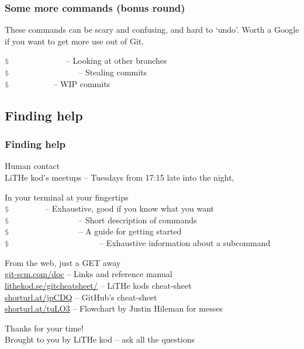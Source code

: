 \documentclass{beamer}
\newcommand{\command}[1]{\colorbox{black!78}{\vphantom{Ep}\texttt{\textcolor{gray}{\$}
\textcolor{white}{#1}}}}
\begin{document}
\begin{frame}[fragile]
  \frametitle{Some more commands (bonus round)}
  These commands can be scary and confusing, and hard to `undo'. Worth a Google if you
  want to get more use out of Git.
  \vspace{1em}
  
  \command{git worktree} -- Looking at other branches \\
  \command{git cherry-pick} -- Stealing commits \\
  \command{git stash} -- WIP commits \\
    
\end{frame}

\subsection{Finding help}

\begin{frame}[fragile]
  \frametitle{Finding help}

  Human contact \\
  \hspace{1em} LiTHe kod's meetups -- Tuesdays from 17:15 late into the night, \\
  \vspace{1em}
  \pause

  In your terminal at your fingertips \\
  \hspace{1em} \command{man git} -- Exhaustive, good if you know what you want \\
  \hspace{1em} \command{man giteveryday} -- Short description of commands \\
  \hspace{1em} \command{man gittutorial} -- A guide for getting started \\
  \hspace{1em} \command{man git <subcommand>} -- Exhaustive information about a subcommand\\
  \vspace{1em}
  \pause

  From the web, just a GET away \\
  \hspace{1em} \url{git-scm.com/doc} -- Links and reference manual \\
  \hspace{1em} \url{lithekod.se/gitcheatsheet/} -- LiTHe kods cheat-sheet \\
  \hspace{1em} \url{shorturl.at/jpCDQ} -- GitHub's cheat-sheet \\
  \hspace{1em} \url{shorturl.at/tuLO3} -- Flowchart by Justin Hileman for messes\\

\end{frame}

\begin{frame}[fragile]
  \begin{center}
    \Huge Thanks for your time! \\[0.75em]
    \small Brought to you by LiTHe kod -- ask all the questions 
  \end{center}
\end{frame}
\end{document}

